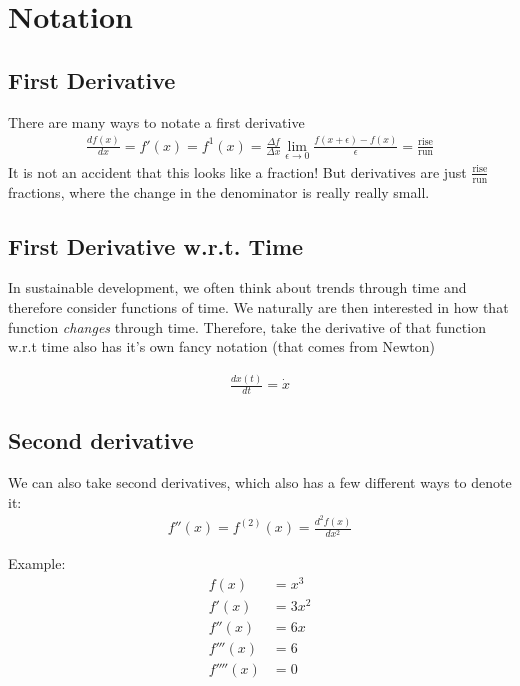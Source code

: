 \documentclass{article}
\begin{document}
\section{Notation}
\subsection{First Derivative}

There are many ways to notate a first derivative
\begin{align}
    \frac{df(x)}{dx} = f'(x) = f^1(x) = \frac{\Delta f}{\Delta x} \lim_{\epsilon \rightarrow 0} \frac{f(x+\epsilon) - f(x)}{\epsilon} = \frac{\text{rise}}{\text{run}}
\end{align}
It is not an accident that this looks like a fraction! But derivatives are just $\frac{\text{rise}}{\text{run}}$ fractions, where the change in the denominator is really really small. \\

\subsection{First Derivative w.r.t. Time}
In sustainable development, we often think about trends through time and therefore consider functions of time. We naturally are then interested in how that function \textit{changes} through time. Therefore, take the derivative of that function w.r.t time also has it's own fancy notation (that comes from Newton)

\begin{align}
    \frac{d x(t)}{dt} = \dot{x}
\end{align}

\subsection{Second derivative}

We can also take second derivatives, which also has a few different ways to denote it:
\begin{align}
    f''(x) = f^{(2)}(x) = \frac{d^2 f(x)}{dx^2}
\end{align}

Example: 
\begin{align*}
    f(x) &= x^3\\
    f'(x) &= 3x^2\\
    f''(x) &= 6x\\
    f'''(x) &= 6\\
    f''''(x) &= 0
\end{align*}
\end{document}
